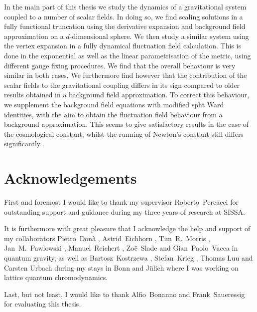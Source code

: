 \documentclass[11pt]{book}
\numberwithin{equation}{chapter}
\begin{document}
In the main part of this thesis we study the dynamics of a gravitational
system coupled to a number of scalar fields. In doing so, we find
scaling solutions in a fully functional truncation using the derivative
expansion and background field approximation on a $d$-dimensional sphere.
We then study a similar system using the vertex expansion in a fully dynamical
fluctuation field calculation. This is done in the exponential as well as the
linear parametrisation of the metric, using different gauge fixing procedures.
We find that the overall behaviour is very similar in both cases.
We furthermore find however that the contribution of the scalar
fields to the gravitational coupling differs in its sign compared to older
results obtained in a background field approximation.
To correct this behaviour, we supplement the background field equations
with modified split Ward identities, with the aim to obtain the fluctuation
field behaviour from a background approximation. This seems to give satisfactory
results in the case of the cosmological constant, whilst the running
of Newton's constant still differs significantly.


\vfill


\makeatletter
\@openrightfalse
\makeatother

\chapter*{Acknowledgements}

First and foremost I would like to thank my supervisor
Roberto~Percacci for outstanding support and guidance during
my three years of research at SISSA.

It is furthermore with great pleasure that I acknowledge the help and support
of my collaborators
Pietro~Don\`a%
, Astrid~Eichhorn%
, Tim~R.~Morris%
, Jan~M.~Pawlowski%
, Manuel~Reichert%
, Zo\"e~Slade
and Gian~Paolo~Vacca
in quantum gravity,
as well as
Bartosz~Kostrzewa%
, Stefan~Krieg%
, Thomas Luu
and Carsten Urbach
during my stays in Bonn and J\"ulich
where I was working on
lattice quantum chromodynamics.

Last, but not least, I would like to thank
Alfio~Bonanno
and
Frank~Saueressig
for evaluating this thesis.
\end{document}

